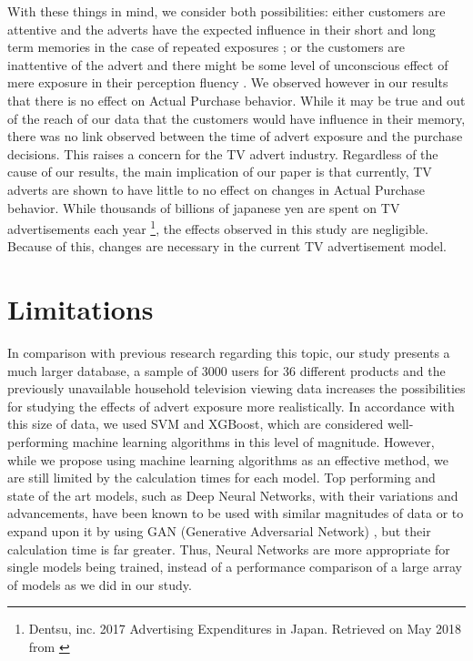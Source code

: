 \documentclass[review]{elsarticle}
\begin{document}
With these things in mind, we consider both possibilities: either customers are attentive and the adverts have the expected influence in their short and long term memories in the case of repeated exposures \cite[][]{rossiter}; or the customers are inattentive of the advert and there might be some level of unconscious effect of mere exposure in their perception fluency \cite[][]{fang}. We observed however in our results that there is no effect on Actual Purchase behavior. While it may be true and out of the reach of our data that the customers would have influence in their memory, there was no link observed between the time of advert exposure and the purchase decisions. This raises a concern for the TV advert industry. Regardless of the cause of our results, the main implication of our paper is that currently, TV adverts are shown to have little to no effect on changes in Actual Purchase behavior. While thousands of billions of japanese yen are spent on TV advertisements each year \footnote{\label{dentsu}Dentsu, inc. 2017 Advertising Expenditures in Japan. Retrieved on May 2018 from \href {http://www.dentsu.com/knowledgeanddata/ad_expenditures/pdf/expenditures_2017.pdf}{}}, the effects observed in this study are negligible. Because of this, changes are necessary in the current TV advertisement model.

\section{Limitations}
\label{limitations}

In comparison with previous research regarding this topic, our study presents a much larger database, a sample of 3000 users for 36 different products and the previously unavailable household television viewing data increases the possibilities for studying the effects of advert exposure more realistically. In accordance with this size of data, we used SVM and XGBoost, which are considered well-performing machine learning algorithms in this level of magnitude. However, while we propose using machine learning algorithms as an effective method, we are still limited by the calculation times for each model. Top performing and state of the art models, such as Deep Neural Networks, with their variations and advancements, have been known to be used with similar magnitudes of data or to expand upon it by using GAN (Generative Adversarial Network) \cite[][]{goodfellow-gan}, but their calculation time is far greater. Thus, Neural Networks are more appropriate for single models being trained, instead of a performance comparison of a large array of models as we did in our study.
\end{document}
